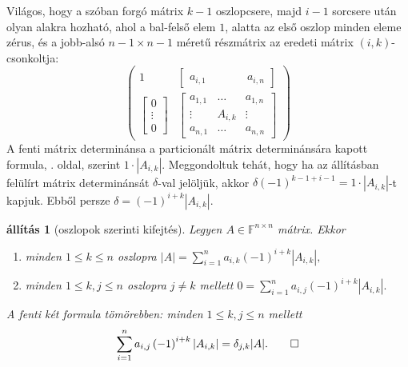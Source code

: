 \documentclass[a4paper, showtrims]{memoir}
\makeatletter
\renewenvironment{proof}[1][\proofname]
    {\par\pushQED{\qed}%
    \normalfont \topsep6\p@\@plus6\p@\relax
    \trivlist
    \item[\hskip\labelsep
        \itshape
    #1\@addpunct{:}]\ignorespaces}
    {\popQED\endtrivlist\@endpefalse}
\theoremstyle{plain}
\newtheorem{proposition}{állítás}[chapter]
\theoremstyle{remark}
\theoremstyle{definition}
\makeatother
\begin{document}
\begin{proof}
	Világos, hogy a szóban forgó mátrix $k-1$ oszlopcsere, 
    majd $i-1$ sorcsere után olyan alakra hozható,
	ahol a bal-felső elem $1$, alatta az első oszlop minden eleme zérus,
	és a jobb-alsó $n-1\times n-1$ méretű részmátrix az eredeti mátrix $\left( i,k \right)$-csonkoltja:
	\[
		\begin{pmatrix}
			1 & \begin{bmatrix}
				a_{i,1}\, & \phantom{A_{i,k}} & \,a_{i,n}
			\end{bmatrix} \\
			\begin{bmatrix}
				0      \\
				\vdots \\
				0
			\end{bmatrix}
			  &
			\begin{bmatrix}
				a_{1,1} & \dots   & a_{1,n} \\
				\vdots  & A_{i,k} & \vdots  \\
				a_{n,1} & \dots   & a_{n,n}
			\end{bmatrix}
		\end{pmatrix}
	\]
	A fenti mátrix determinánsa a particionált mátrix determinánsára kapott formula,
    \aazt{\pageref{par:particionalt}}. oldal,
	szerint $1\cdot|A_{i,k}|$.
	Meggondoltuk tehát, hogy ha az állításban felülírt mátrix determinánsát $\delta$-val jelöljük,
	akkor  $\delta\left( -1 \right)^{k-1+i-1}=1\cdot|A_{i,k}|$-t kapjuk.
	Ebből persze
	\begin{math}
		\delta
		=\left( -1 \right)^{i+k}|A_{i,k}|.
	\end{math}
\end{proof}
\begin{proposition}[oszlopok szerinti kifejtés]
	Legyen $A\in\mathbb{F}^{n\times n}$ mátrix.
	Ekkor
	\begin{enumerate}
		\item minden $1\leq k\leq n$ oszlopra
		      \(
		      |A|=
		      \sum_{i=1}^na_{i,k}\left( -1 \right)^{i+k}|A_{i,k}|,
		      \)
		\item minden $1\leq k,j\leq n$ oszlopra $j\neq k$ mellett
		      \(
		      0=
		      \sum_{i=1}^na_{i,j}\left( -1 \right)^{i+k}|A_{i,k}|.
		      \)
	\end{enumerate}
	A fenti két formula tömörebben: minden $1\leq k,j\leq n$ mellett
	\[
		\sum_{i=1}^na_{i,j}\left( -1 \right)^{i+k}|A_{i,k}|
		=
		\delta_{j,k}|A|.\qedhere
	\]
\end{proposition}
\end{document}
